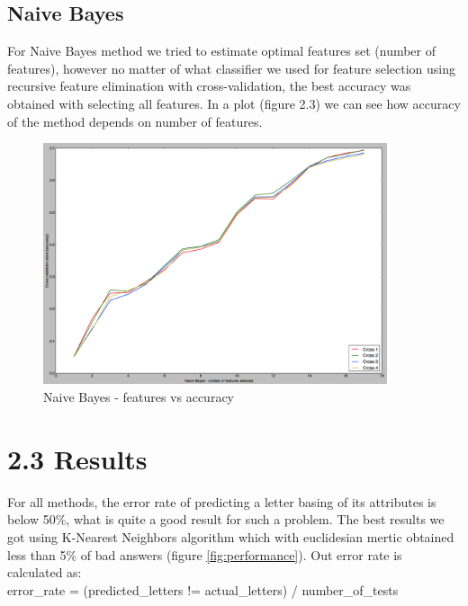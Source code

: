 \subsection{Naive Bayes}
For Naive Bayes method we tried to estimate optimal features set (number of features), however no matter of what
classifier we used for feature selection using recursive feature elimination with cross-validation, the best accuracy was
obtained with selecting all features. In a plot (figure 2.3) we can see how accuracy of the method 
depends on number of features.
\begin{figure}[!tbh]
	\centering
	\includegraphics[width=0.9\textwidth]{figures/NB_feature_selection}
	\caption{Naive Bayes - features vs accuracy}
	\label{fig:NB_feature_selection}
\end{figure}
\section*{2.3 Results}
For all methods, the error rate of predicting a letter basing of its attributes is below 50\%, what is quite a good result for
such a problem. The best results we got using K-Nearest Neighbors algorithm which with euclidesian mertic obtained less
than 5\% of bad answers (figure \ref{fig:performance}). Out error rate is calculated as: \\
error\_rate = (predicted\_letters != actual\_letters) / number\_of\_tests

